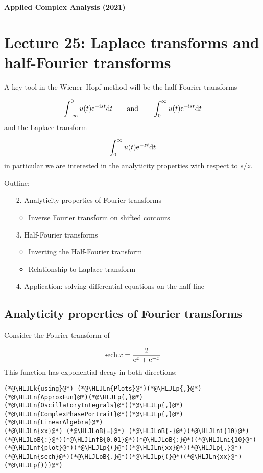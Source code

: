 \documentclass[12pt,a4paper]{article}
\newcommand{\HLJLk}[1]{\textcolor[RGB]{148,91,176}{\textbf{#1}}}
\newcommand{\HLJLn}[1]{#1}
\newcommand{\HLJLnf}[1]{\textcolor[RGB]{66,102,213}{#1}}
\newcommand{\HLJLnfB}[1]{\textcolor[RGB]{59,151,46}{#1}}
\newcommand{\HLJLni}[1]{\textcolor[RGB]{59,151,46}{#1}}
\newcommand{\HLJLoB}[1]{\textcolor[RGB]{102,102,102}{\textbf{#1}}}
\newcommand{\HLJLp}[1]{#1}
\def\qqand{\qquad\hbox{and}\qquad}
\def\D{ {\rm d} }
\def\I{ {\rm i} }
\def\E{ {\rm e} }
\def\sech{ {\rm sech}\, }
\def\dt{\D t}
\def\endash{–}
\begin{document}
\textbf{Applied Complex Analysis (2021)}

\section{Lecture 25: Laplace transforms and half-Fourier transforms}
A key tool in the Wiener\ensuremath{\endash}Hopf method will be the half-Fourier transforms

\[
\int_{-\infty}^0 u(t) \E^{-\I s t} \dt \qqand \int_0^\infty u(t) \E^{-\I s t} \dt
\]
and the Laplace transform

\[
\int_0^\infty u(t) \E^{-z t} \dt
\]
in particular we are interested in the analyticity properties with respect to $s$/$z$.

Outline:

\begin{itemize}
\item[2. ] Analyticity properties of Fourier transforms

\begin{itemize}
\item Inverse Fourier transform on shifted contours

\end{itemize}

\item[3. ] Half-Fourier transforms

\begin{itemize}
\item Inverting the Half-Fourier transform


\item Relationship to Laplace transform

\end{itemize}

\item[4. ] Application: solving differential equations on the half-line

\end{itemize}
\subsection{Analyticity properties of Fourier transforms}
Consider the Fourier transform of

\[
\sech x = {2 \over \E^x + \E^{-x}}
\]
This function has exponential decay in both directions:


\begin{lstlisting}
(*@\HLJLk{using}@*) (*@\HLJLn{Plots}@*)(*@\HLJLp{,}@*) (*@\HLJLn{ApproxFun}@*)(*@\HLJLp{,}@*) (*@\HLJLn{OscillatoryIntegrals}@*)(*@\HLJLp{,}@*) (*@\HLJLn{ComplexPhasePortrait}@*)(*@\HLJLp{,}@*) (*@\HLJLn{LinearAlgebra}@*)
(*@\HLJLn{xx}@*) (*@\HLJLoB{=}@*) (*@\HLJLoB{-}@*)(*@\HLJLni{10}@*)(*@\HLJLoB{:}@*)(*@\HLJLnfB{0.01}@*)(*@\HLJLoB{:}@*)(*@\HLJLni{10}@*)
(*@\HLJLnf{plot}@*)(*@\HLJLp{(}@*)(*@\HLJLn{xx}@*)(*@\HLJLp{,}@*)(*@\HLJLn{sech}@*)(*@\HLJLoB{.}@*)(*@\HLJLp{(}@*)(*@\HLJLn{xx}@*)(*@\HLJLp{))}@*)
\end{lstlisting}
\end{document}
